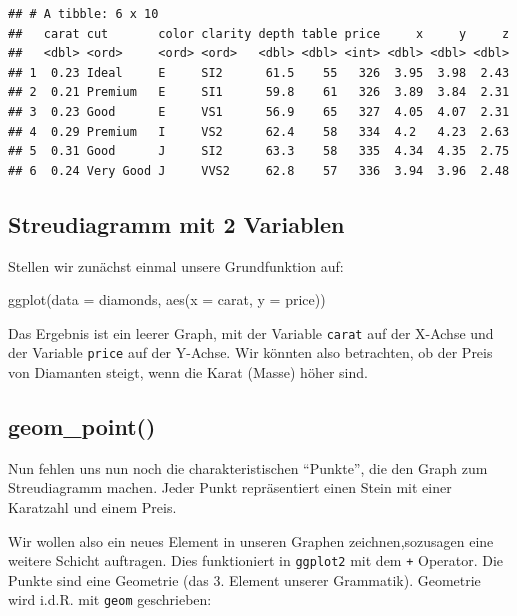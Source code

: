 \documentclass[
]{book}
\newenvironment{Shaded}{\begin{snugshade}}{\end{snugshade}}
\newcommand{\AttributeTok}[1]{\textcolor[rgb]{0.77,0.63,0.00}{#1}}
\newcommand{\FunctionTok}[1]{\textcolor[rgb]{0.00,0.00,0.00}{#1}}
\newcommand{\NormalTok}[1]{#1}
\begin{document}
\begin{verbatim}
## # A tibble: 6 x 10
##   carat cut       color clarity depth table price     x     y     z
##   <dbl> <ord>     <ord> <ord>   <dbl> <dbl> <int> <dbl> <dbl> <dbl>
## 1  0.23 Ideal     E     SI2      61.5    55   326  3.95  3.98  2.43
## 2  0.21 Premium   E     SI1      59.8    61   326  3.89  3.84  2.31
## 3  0.23 Good      E     VS1      56.9    65   327  4.05  4.07  2.31
## 4  0.29 Premium   I     VS2      62.4    58   334  4.2   4.23  2.63
## 5  0.31 Good      J     SI2      63.3    58   335  4.34  4.35  2.75
## 6  0.24 Very Good J     VVS2     62.8    57   336  3.94  3.96  2.48
\end{verbatim}

\hypertarget{streudiagramm-mit-2-variablen}{%
\subsection{Streudiagramm mit 2 Variablen}\label{streudiagramm-mit-2-variablen}}

Stellen wir zunächst einmal unsere Grundfunktion auf:

\begin{Shaded}
\begin{Highlighting}[]
\FunctionTok{ggplot}\NormalTok{(}\AttributeTok{data =}\NormalTok{ diamonds, }\FunctionTok{aes}\NormalTok{(}\AttributeTok{x =}\NormalTok{ carat, }\AttributeTok{y =}\NormalTok{ price))}
\end{Highlighting}
\end{Shaded}

Das Ergebnis ist ein leerer Graph, mit der Variable \texttt{carat} auf der X-Achse und der Variable \texttt{price} auf der Y-Achse. Wir könnten also betrachten, ob der Preis von Diamanten steigt, wenn die Karat (Masse) höher sind.

\hypertarget{geom_point}{%
\subsection{geom\_point()}\label{geom_point}}

Nun fehlen uns nun noch die charakteristischen ``Punkte'', die den Graph zum Streudiagramm machen. Jeder Punkt repräsentiert einen Stein mit einer Karatzahl und einem Preis.

Wir wollen also ein neues Element in unseren Graphen zeichnen,sozusagen eine weitere Schicht auftragen. Dies funktioniert in \texttt{ggplot2} mit dem \texttt{+} Operator. Die Punkte sind eine Geometrie (das 3. Element unserer Grammatik). Geometrie wird i.d.R. mit \texttt{geom} geschrieben:
\end{document}
